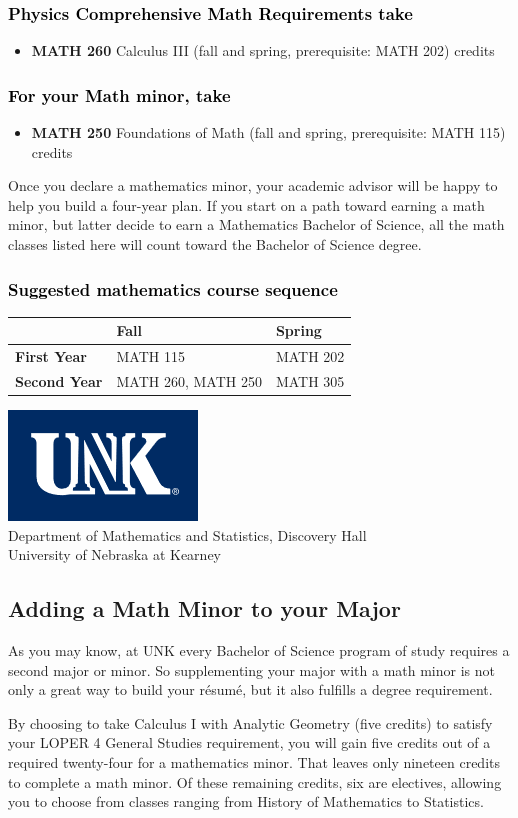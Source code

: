 \documentclass[10pt]{article}
\newcommand{\calconeshort}{MATH 115}
\newcommand{\calctwoshort}{MATH 202}
\newcommand{\foundations}{\textbf{MATH 250} Foundations of Math (fall and spring, prerequisite: MATH 115)  \dotfill 3 credits}
\newcommand{\foundationsshort}{MATH 250}
\newcommand{\calcthree}{\textbf{MATH 260} Calculus III  (fall and spring, prerequisite: MATH 202) \dotfill 5 credits}
\newcommand{\calcthreeshort}{MATH 260}
\newcommand{\diffeqshort}{MATH 305}
\newcommand{\LOPER}{LOPER\xspace}
\newcommand{\myheading}{
\begin{flushleft}
\includegraphics[scale=0.35]{unk-logo}\\
\setcounter{footnote}{0}
\vspace{0.25in}
 \textcolor{unkblue}{Department of Mathematics and Statistics, Discovery Hall} \\
  \textcolor{unkblue}{University of Nebraska at Kearney}
\end{flushleft}}
\newcommand{\mathminorALT}{
\begin{center}
   \begin{tabular}[h]{| l | l | l|} 
      \hline
                 & \textbf{Fall}         &  \textbf{Spring}  \\ \hline 
      \textbf{First Year} & \calconeshort & \calctwoshort{}  \\  \hline
      \textbf{Second Year} &  \calcthreeshort{},  \foundationsshort{}  & \diffeqshort \\ \hline
         \end{tabular}
      \end{center}}
\begin{document}
\subsubsection*{\textcolor{black}{Physics Comprehensive Math Requirements take}}
\begin{itemize}
 \item \calcthree
\end{itemize}

\subsubsection*{\textcolor{black}{For your Math minor, take}}
\begin{itemize}
\item \foundations
\end{itemize}

\vspace{0.1in}
  

 Once you declare a mathematics minor, your academic advisor will be 
 happy to help you build a four-year plan. If you start on a path toward earning 
 a math minor, but latter decide to earn a  Mathematics Bachelor of Science, 
 all the math classes listed here will count toward the Bachelor of Science degree.


\subsubsection*{\textcolor{black}{Suggested mathematics course sequence}}

\mathminorALT




\newpage

\myheading

\subsection*{\textbf{\textcolor{unkblue}{Adding a Math Minor to your Major}}}

As you may know, at UNK every Bachelor of Science program of study requires a second
major or minor. So supplementing your major with a math minor is not only a great
way to build your r\'esum\'e, but it also fulfills a degree requirement.

By choosing to take Calculus I with Analytic Geometry (five credits) to satisfy
your \LOPER 4 General Studies requirement, you will gain five credits out of a
required twenty-four for a mathematics minor. That leaves only nineteen credits
to complete a math minor.  Of these remaining credits, six are electives, allowing
you to choose from classes ranging from History of Mathematics to Statistics.
\end{document}
